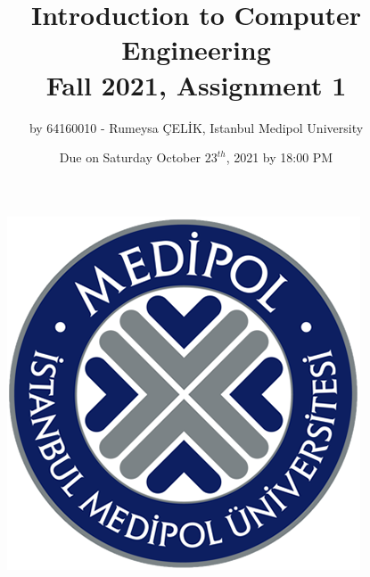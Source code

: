\documentclass[a4paper, 11pt]{report}
\begin{document}
\begin{figure}
\includegraphics[scale=.63]{medipol.png}
\centering
\end{figure}
\begin{titlepage}
\title{Introduction to Computer Engineering \\ Fall 2021, Assignment 1}
\author{by 64160010 - Rumeysa ÇELİK, Istanbul Medipol University}
\date{Due on Saturday October $23^{th}$, 2021 by 18:00 PM}
\maketitle
\end{titlepage}
{}
\end{document}
